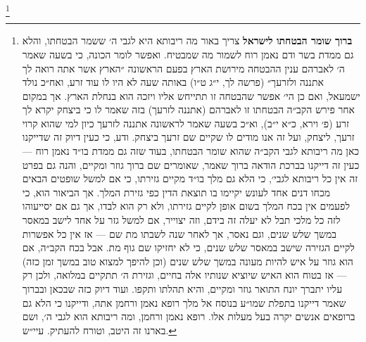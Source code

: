 \documentclass[12pt, openany]{book}
\newcommand{\footnotecomment}[1]{
	\renewcommand\thefootnote{}
	\footnote{\textsf{#1}}}
\newcommand{\commenta}[1]{\footnotecomment{#1}\hspace{0em}}
\begin{document}
\commenta{\textrm{\textbf{ברוך שומר הבטחתו לישראל}} צריך באור מה ריבותא היא לגבי ה׳ ששמר הבטחתו, והלא גם ממדת בשר ודם נאמן רוח לשמור מה שמבטיח. ואפשר לומר הכונה, כי בשעה שאמר ה׳ לאברהם ענין ההבטחה מירושת הארץ בפעם הראשונה ״הארץ אשר אתה רואה לך אתננה ולזרעך״ (פרשה לך, י״ג ט״ו) באותה שעה לא היו לו עוד זרע, ואח״כ נולד ישמעאל, ואם כן הי׳ אפשר שהבטחה זו תתייחש אליו ויזכה הוא בנחלת הארץ. אך במקום אחר פירש הקב״ה הבטחתו זו לאברהם (אתננה לזרעך) בזה שאמר לו כי ביצחק יקרא לך זרע (פ׳ וירא, כ״א י״ב), וא״כ בשעה שאמר לראשונה אתננה לזרעך כיון למי שהוא קרוי זרעך, ליצחק, ועל זה אנו מודים לו שקיים שם זרעך ביצחק. ודע, כי כעין דיוק זה שדייקנו כאן מה ריבותא לגבי הקב״ה שהוא שומר הבטחתו, בעוד שזה גם ממדת בו״ד נאמן רוח — כעין זה דייקנו בברכת הודאה ברוך שאמר, שאומרים שם ברוך גוזר ומקיים, והנה גם בפרט זה אין כל ריבותא לגבי׳, כי הלא גם מלך בו״ד מקיים גזירתו, כי אם למשל שופטים הבאים מכחו דנים אחד לעונש יקיימו בו תוצאת הדין כפי גזירת המלך. אך הביאור הוא, כי לפעמים אין בכח המלך בשום אופן לקיים גזירתו, ולא רק הוא לבדו, אך גם אם יסייעוהו לזה כל מלכי תבל לא יעלה זה בידם, וזה יצוייר, אם למשל גזר על אחד לישב במאסר במשך שלש שנים, וגם נאסר, אך לאחר שנה לשבתו מת שם — אז אין כל אפשרות לקיים הגזירה שישב במאסר שלש שנים, כי לא יחזיקו שם גוף מת. אבל בכח הקב״ה, אם הוא גוזר על איש להיות מעונה במשך שלש שנים (וכן להיפך למצוא טוב במשך זמן כזה) — אז בטוח הוא האיש שיוציא שנותיו אלה בחיים, וגזירת ה׳ תתקיים במלואה, ולכן רק עליו יתברך יונח התואר גוזר ומקיים, והיא תהלתו ותקפו. ועוד דיוק כזה שבכאן ובברוך שאמר דייקנו בתפלת שמו״ע בנוסח אל מלך רופא נאמן ורחמן אתה, ודייקנו כי הלא גם ברופאים אנשים יקרה בעל מעלות אלו. רופא נאמן ורחמן, ומה ריבותא הוא לגבי ה׳, ושם בארנו זה היטב, וטורח להעתיק. עיי״ש.}%
\end{document}
